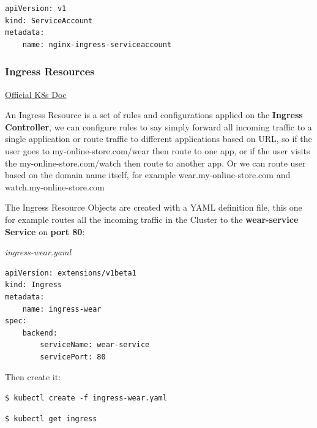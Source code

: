 \documentclass{article}
\newenvironment{codetemplate}[1][]{%
  \mybasecolorbox[#1]
  \itshape
}{%
  \endmybasecolorbox
}
\begin{document}
\begin{codetemplate}{}
\begin{verbatim}
apiVersion: v1
kind: ServiceAccount
metadata:
    name: nginx-ingress-serviceaccount
\end{verbatim}
\end{codetemplate}

\subsubsection{Ingress Resources}

\href{https://kubernetes.io/docs/concepts/services-networking/ingress/}{Official K8s Doc}

An Ingress Resource is a set of rules and configurations applied on the \textbf{Ingress Controller}, we can configure rules to say simply forward all incoming traffic to a single application or route traffic to different applications based on URL, so if the user  goes to my-online-store.com/wear then route to one app, or if the user visits the my-online-store.com/watch then route to another app. Or we can route user based on the domain name itself, for example wear.my-online-store.com and watch.my-online-store.com

The Ingress Resource Objects are created with a YAML definition file, this one for example routes all the incoming traffic in the Cluster to the \textbf{wear-service Service} on \textbf{port 80}:

\begin{codetemplate}{ingress-wear.yaml}
\begin{verbatim}
apiVersion: extensions/v1beta1
kind: Ingress
metadata:
    name: ingress-wear
spec:
    backend:
        serviceName: wear-service
        servicePort: 80
\end{verbatim}
\end{codetemplate}

Then create it:

\begin{codetemplate}{}
\begin{verbatim}
$ kubectl create -f ingress-wear.yaml
\end{verbatim}
\end{codetemplate}

\begin{codetemplate}{}
\begin{verbatim}
$ kubectl get ingress
\end{verbatim}
\end{codetemplate}
\end{document}
